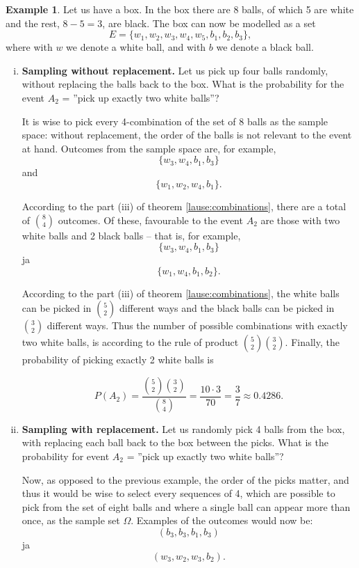 \documentclass[12pt,a4paper,leqno]{report}
\theoremstyle{plain}
\theoremstyle{definition}
\newtheorem{esim}[equation]{Example}
\begin{document}
\begin{esim}
\label{esim:balls}
Let us have a box. In the box there are 8 balls, of which 5 are white and the rest, $8-5=3$, are black. The box can now be modelled as a set
\[
E = \{w_1, w_2, w_3, w_4, w_5, b_1, b_2, b_3\},
\]
where with $w$ we denote a white ball, and with $b$ we denote a black ball.

\begin{enumerate}[(i)]
\item \textbf{Sampling without replacement.} 
Let us pick up four balls randomly, without replacing the balls back to the box. What is the probability for the event $A_2$ = ''pick up exactly two white balls''?

It is wise to pick every 4-combination of the set of 8 balls as the sample space: without replacement, the order of the balls is not relevant to the event at hand. Outcomes from the sample space are, for example,
\[
\{w_3, w_4, b_1, b_3\}
\]
and
\[
\{w_1, w_2, w_4, b_1\}.
\]

According to the part (iii) of theorem \ref{lause:combinations}, there are a total of $\binom{8}{4}$ outcomes. Of these, favourable to the event $A_2$ are those with two white balls and 2 black balls -- that is, for example,
\[
\{w_3, w_4, b_1, b_3\}
\]
ja
\[
\{w_1, w_4, b_1, b_2\}.
\]

According to the part (iii) of theorem \ref{lause:combinations}, the white balls can be picked in $\binom{5}{2}$ different ways and the black balls can be picked in $\binom{3}{2}$ different ways. Thus the number of possible combinations with exactly two white balls, is according to the rule of product $\binom{5}{2}\binom{3}{2}$. Finally, the probability of picking exactly 2 white balls is

\[
P(A_2) =  \frac{\binom{5}{2}\binom{3}{2}}{\binom{8}{4}} = \frac{10 \cdot 3}{70} = \frac{3}{7} \approx 0.4286.
\]

\item \textbf{Sampling with replacement.} 
Let us randomly pick 4 balls from the box, with replacing each ball back to the box between the picks. What is the probability for event $A_2$ = ''pick up exactly two white balls''?

Now, as opposed to the previous example, the order of the picks matter, and thus it would be wise to select every sequences of 4, which are possible to pick from the set of eight balls and where a single ball can appear more than once, as the sample set $\Omega$. Examples of the outcomes would now be:
\[
(b_3, b_3, b_1, b_3)
\]
ja
\[
(w_3, w_2, w_3, b_2).
\]


\end{enumerate}
\end{esim}
\end{document}
